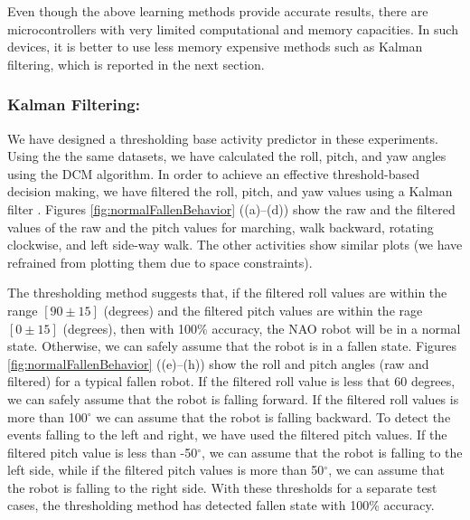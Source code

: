 \documentclass[letterpaper]{article}
\begin{document}
\begin{sloppy}

Even though the above learning methods provide accurate results, there are microcontrollers with 
very limited computational and memory capacities. In such devices, it is better to use less memory 
expensive methods such as Kalman filtering, which is reported in the next section.

\subsubsection{Kalman Filtering:}

We have designed a thresholding base activity predictor in these experiments. Using the the same 
datasets, we have calculated the roll, pitch, and yaw angles  using the DCM algorithm. In order to 
achieve an effective threshold-based decision making, we have filtered the roll, pitch, and
yaw values using a Kalman filter \cite{Welch:1995:IKF:897831}. Figures 
\ref{fig:normalFallenBehavior} ((a)--(d)) show
the raw and the filtered values of the raw and the pitch values for marching, walk backward,
rotating clockwise, and left side-way walk. The other activities show similar plots (we have 
refrained from plotting them due to space constraints). 

The thresholding method suggests that, if the filtered roll values are within the range $[90\pm15]$ 
(degrees) and the filtered pitch values are within the rage $[0\pm15]$ (degrees), then with 100\% 
accuracy, the NAO  robot will be in a normal state. Otherwise, we can safely assume that the robot 
is in a fallen state. Figures \ref{fig:normalFallenBehavior} ((e)--(h)) show the roll and pitch 
angles (raw and filtered) for a typical fallen robot. If the filtered roll value is less that 60 
degrees, we can safely assume that the robot is falling forward. If the filtered roll values is 
more than 100$^{\circ}$ we can assume that the robot is falling backward. To detect the events 
falling to the left and right, we have used the filtered pitch values. If the filtered pitch value 
is less than -50$^{\circ}$, we can assume that the robot is falling to the left side, while if the 
filtered pitch values is more than 50$^{\circ}$, we can assume that the robot is falling to the right 
side. With these thresholds for a separate test cases, the thresholding method has detected fallen 
state with 100\% accuracy. 


\end{sloppy}
\end{document}
